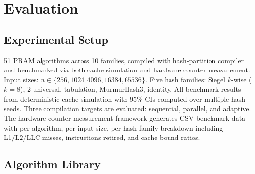 \documentclass[11pt]{article}
\begin{document}
\section{Evaluation}
\label{sec:evaluation}

\subsection{Experimental Setup}

51 PRAM algorithms across 10 families, compiled with hash-partition
compiler and benchmarked via both cache simulation and hardware counter
measurement.  Input sizes:
$n \in \{256, 1024, 4096, 16384, 65536\}$.  Five hash families:
Siegel $k$-wise ($k = 8$), 2-universal, tabulation, MurmurHash3,
identity.  All benchmark results from deterministic cache simulation
with 95\% CIs computed over multiple hash seeds.
Three compilation targets are evaluated: sequential, parallel, and
adaptive.  The hardware counter measurement framework generates CSV
benchmark data with per-algorithm, per-input-size, per-hash-family
breakdown including L1/L2/LLC misses, instructions retired, and
cache bound ratios.

\subsection{Algorithm Library}
\end{document}

